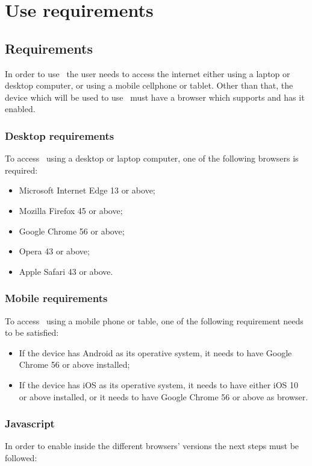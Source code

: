 \section{Use requirements}

\subsection{Requirements}
In order to use \app\ the user needs to access the internet either using a laptop or desktop computer, or using a mobile cellphone or tablet. Other than that, the device which will be used to use \app\ must have a browser which supports  and has it enabled.

\subsubsection{Desktop requirements}
To access \app\ using a desktop or laptop computer, one of the following browsers is required:
\begin{itemize}
	\item Microsoft Internet Edge 13 or above;
	\item Mozilla Firefox 45 or above;
	\item Google Chrome 56 or above;
	\item Opera 43 or above;
	\item Apple Safari 43 or above.
\end{itemize}

\subsubsection{Mobile requirements}
To access \app\ using a mobile phone or table, one of the following requirement needs to be satisfied:
\begin{itemize}
	\item If the device has Android as its operative system, it needs to have Google Chrome 56 or above installed;
	\item If the device has iOS as its operative system, it needs to have either iOS 10 or above installed, or it needs to have Google Chrome 56 or above as browser.
\end{itemize}

\subsubsection{Javascript}
In order to enable  inside the different browsers' versions the next steps must be followed:


